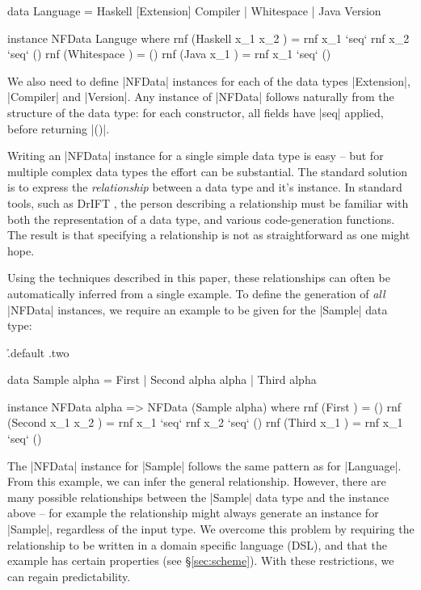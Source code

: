 \documentclass{llncs}
\begin{document}
\begin{code}
data Language  =  Haskell [Extension] Compiler
               |  Whitespace
               |  Java Version

instance NFData Languge where
    rnf (Haskell x_1 x_2  ) = rnf x_1 `seq` rnf x_2 `seq` ()
    rnf (Whitespace       ) = ()
    rnf (Java x_1         ) = rnf x_1 `seq` ()
\end{code}

We also need to define |NFData| instances for each of the data types |Extension|, |Compiler| and |Version|. Any instance of |NFData| follows naturally from the structure of the data type: for each constructor, all fields have |seq| applied, before returning |()|.

Writing an |NFData| instance for a single simple data type is easy -- but for multiple complex data types the effort can be substantial. The standard solution is to express the \textit{relationship} between a data type and it's instance. In standard tools, such as DrIFT \cite{drift}, the person describing a relationship must be familiar with both the representation of a data type, and various code-generation functions. The result is that specifying a relationship is not as straightforward as one might hope.

Using the techniques described in this paper, these relationships can often be automatically inferred from a single example. To define the generation of \textit{all} |NFData| instances, we require an example to be given for the |Sample| data type:

\h{.default .two}\begin{code}
data Sample alpha  =  First
                   |  Second alpha alpha
                   |  Third alpha

instance NFData alpha => NFData (Sample alpha) where
    rnf (First           ) = ()
    rnf (Second x_1 x_2  ) = rnf x_1 `seq` rnf x_2 `seq` ()
    rnf (Third x_1       ) = rnf x_1 `seq` ()
\end{code}

The |NFData| instance for |Sample| follows the same pattern as for |Language|. From this example, we can infer the general relationship. However, there are many possible relationships between the |Sample| data type and the instance above -- for example the relationship might always generate an instance for |Sample|, regardless of the input type. We overcome this problem by requiring the relationship to be written in a domain specific language (DSL), and that the example has certain properties (see \S\ref{sec:scheme}). With these restrictions, we can regain predictability.
\end{document}

